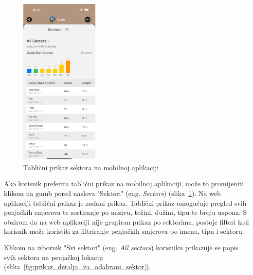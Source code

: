 \begin{figure}[H]
    \centering
    \includegraphics[width=0.35\textwidth]{images/implementacija/crag-details/crag-all-sectors-table.png}
    \caption{Tablični prikaz sektora na mobilnoj aplikaciji}
    \label{fig:tablični_prikaz_sektora}
\end{figure}

Ako korisnik preferira tablični prikaz na mobilnoj aplikaciji, može to promijeniti klikom na gumb pored naslova "Sektori" (eng. \textit{Sectors}) (slika~\ref{fig:tablični_prikaz_sektora}). Na web aplikaciji tablični prikaz je zadani prikaz. Tablični prikaz omogućuje pregled svih penjačkih smjerova te sortiranje po nazivu, težini, dužini, tipu te broju uspona. S obzirom da na web aplikaciji nije grupiran prikaz po sektorima, postoje filteri koji korisnik može koristiti za filtriranje penjačkih smjerova po imenu, tipu i sektoru.

Klikom na izbornik "Svi sektori" (eng. \textit{All sectors}) korisniku prikazuje se popis svih sektora na penjačkoj lokaciji (slika~\ref{fig:prikaz_detalja_za_odabrani_sektor}). 


